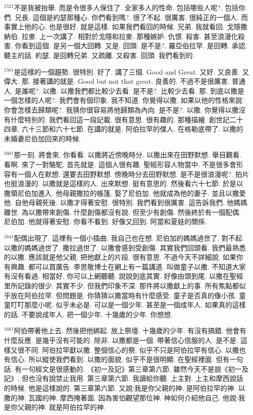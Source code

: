 \documentclass{book}
\begin{document}
$^{1521}$不是我被抬舉.
而是令很多人保住了.
全家多人的性命.
包括哪些人呢?.
包括你們.
兄長.
這個是約瑟那種心.
你們看到嗎?.
很了不起.
很厲害.
很純正的一個人.
而事實上他的心.
也是很好.
就是這樣.
如果我們看回的時候.
兄弟.
我就看回.
戈隱撒納伯.
拉麥.
上一次講了.
相對於戈隱和拉麥.
那種嫉妒.
仇恨.
殺害.
甚至浪漫化殺害.
你看到這個.
是另一個大回轉.
又是.
回頭.
是不是?.
羅亞伯拉罕.
是回轉.
承認.
聽主的話.
約瑟.
是回轉兄弟.
又疏離.
又殺害.
回頭.
我們看到的.

$^{1561}$是這樣的一個趨勢.
很特別.
好了.
講了三個.
Good and Great.
又好.
又良善.
又偉大.
那.
接著講的就是.
Good but not that great.
良善的.
不過不是很厲害.
普通人.
是誰呢?.
以撒.
以撒我們都比較少去看.
是不是?.
比較少去看.
那.
到底以撒是一個怎樣的人呢?.
我們會有個印象.
我不知道.
你覺得以撒.
如果以他的性格來說.
你會怎樣去歸類呢?.
我猜你很容易將他歸類為內向.
是不是?.
以撒.
你覺得以撒沒有什麼特別的.
我們看回這一段記載.
很有意思.
很有趣的.
那種描繪.
創世記二十四章.
六十三節和六十七節.
在講的就是.
阿伯拉罕的僕人.
在格勒底帶了.
以撒的未婚妻尼伯加回來的時候.

$^{1601}$那一刻.
將會來.
你看看.
以撒將近傍晚時分.
以撒出來在田野默想.
舉目觀看.
看啊.
來了一對駱駝.
首先就是.
這個人很有趣.
聖經形容人物當中.
不是很多會形容有一個人在默想.
還要去田野默想.
傍晚時分去田野默想.
是不是很浪漫呢?.
拍片也挺浪漫的.
以撒就是這樣的人.
出來默想.
挺有意思的.
然後看六十七節.
於是以撒領尼伯加進入.
他母親撒拉的帳篷.
娶了尼伯加.
他就成為他的妻子.
並且以撒愛他.
自他母親死後.
以撒才得著安慰.
很特別.
我們看到很厲害.
這告訴我們.
他媽媽離世.
為以撒帶來創傷.
什麼創傷都沒有說.
但至少有創傷.
然後終於有一個配偶.
尼伯加.
他就得著安慰.
你看不看到.
好像又回到.
阿當和夏娃的關係.

$^{1641}$配偶出現了.
這裡有一個小插曲.
我自己也在想.
尼伯加的媽媽過世了.
對不起.
以撒的媽媽過世了.
撒拉過世了.
以撒會感到受創傷.
其實我們回頭看.
我們最熟悉的以撒.
應該就是他父親.
把他獻上的片段.
很有意思.
不過今天不詳細說.
如果你有興趣.
都可以買廣告.
李思敬博士在網上有一篇講道.
叫做童子以撒.
不知道大家有沒有看過.
相當好.
你可以上網聽聽.
說說到底其實.
好像由頭到尾.
以撒在聖經里所記錄的很少.
其實不少.
但我們印象不深.
那件將以撒獻上的事.
所有焦點都似乎放在阿伯拉罕.
但問題是.
你猜猜以撒當時有什麼感受.
童子是否真的像小孩.
童童叮叮那麼小呢.
似乎未必是.
可以是一個少年.
甚至是一個成年人.
如果真的這樣的話.
不要說成年人.
把一個少年.
十幾歲的少年.
你想想.

$^{1681}$阿伯帶著他上去.
然後把他綁起.
放上祭壇.
十幾歲的少年.
有沒有搞錯.
他會有什麼反應.
是幾乎沒有可能的.
除非.
以撒都是一個.
帶著信心信服的人.
是不是.
這樣又很不同.
阿伯拉罕獻以撒.
整個信心的祭.
似乎不只是阿伯拉罕有信心.
以撒也有信心.
所以縱使我們看到.
以撒的面貌.
似乎不是很明顯.
在聖經裡面.
但有一句話.
有一句經文是很感動的.
《初一及記》第三章第六節.
雖然今天不是說《初一及記》.
但也沒有說禁止我用.
第三章第六節.
我讀給你聽.
上主對.
上主和摩西說話的時候.
他是這樣說的.
第三章第六節.
又說:我是你父親的神.
是阿伯拉罕的神.
以撒的神.
瓦國的神.
摩西掩著面.
因為害怕觀望那位神.
神如何介紹他自己.
他說:我是你父親的神.
就是阿伯拉罕的神.
\end{document}
